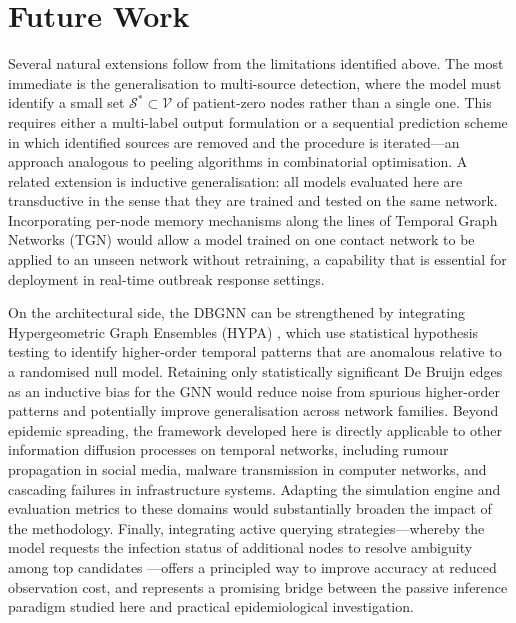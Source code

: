 \section{Future Work}
\label{st:futurework_ch}

Several natural extensions follow from the limitations identified above. The
most immediate is the generalisation to multi-source detection, where the model
must identify a small set $\mathcal{S}^* \subset \mathcal{V}$ of patient-zero
nodes rather than a single one. This requires either a multi-label output
formulation or a sequential prediction scheme in which identified sources are
removed and the procedure is iterated---an approach analogous to peeling
algorithms in combinatorial optimisation. A related extension is inductive
generalisation: all models evaluated here are transductive in the sense that
they are trained and tested on the same network. Incorporating per-node memory
mechanisms along the lines of Temporal Graph Networks (TGN) \cite{Rossi2020}
would allow a model trained on one contact network to be applied to an unseen
network without retraining, a capability that is essential for deployment in
real-time outbreak response settings.

On the architectural side, the DBGNN can be strengthened by integrating
Hypergeometric Graph Ensembles (HYPA) \cite{vonPichowski2024}, which use
statistical hypothesis testing to identify higher-order temporal patterns that
are anomalous relative to a randomised null model. Retaining only statistically
significant De Bruijn edges as an inductive bias for the GNN would reduce noise
from spurious higher-order patterns and potentially improve generalisation
across network families. Beyond epidemic spreading, the framework developed
here is directly applicable to other information diffusion processes on temporal
networks, including rumour propagation in social media, malware transmission in
computer networks, and cascading failures in infrastructure systems. Adapting
the simulation engine and evaluation metrics to these domains would substantially
broaden the impact of the methodology. Finally, integrating active querying
strategies---whereby the model requests the infection status of additional
nodes to resolve ambiguity among top candidates \cite{Sterchi2025}---offers a
principled way to improve accuracy at reduced observation cost, and represents
a promising bridge between the passive inference paradigm studied here and
practical epidemiological investigation.
